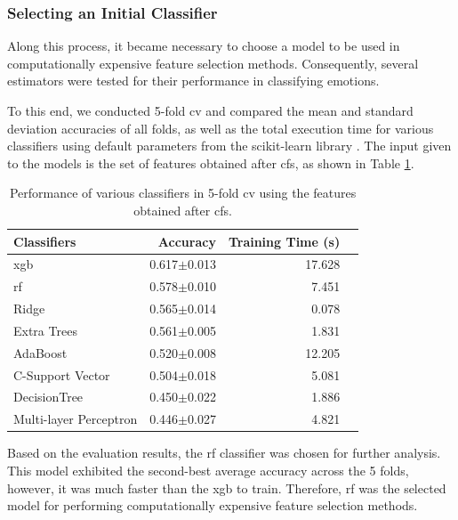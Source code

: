 \subsubsection{Selecting an Initial Classifier}

Along this process, it became necessary to choose a model to be used in computationally expensive feature selection methods. Consequently, several estimators were tested for their performance in classifying emotions.

To this end, we conducted 5-fold \ac{cv} and compared the mean and standard deviation accuracies of all folds, as well as the total execution time for various classifiers using default parameters from the scikit-learn library \cite{pedregosa2011scikit}. The input given to the models is the set of features obtained after \ac{cfs}, as shown in Table \ref{tab:modelsPerformance}.

\begin{table}[H]
	\caption{Performance of various classifiers in 5-fold \ac{cv} using the features obtained after \ac{cfs}.}
	\centering
	\label{tab:modelsPerformance}
	\begin{tabular}{lrrr}
		\toprule
		Classifiers &  Accuracy & Training Time (s) \\
		\midrule
		\ac{xgb}                &        0.617$\pm$0.013  & 17.628 \\
		\ac{rf}                &        0.578$\pm$0.010  &  7.451 \\
		Ridge                  &        0.565$\pm$0.014  &  0.078 \\
		Extra Trees            &        0.561$\pm$0.005  &  1.831  \\
		AdaBoost               &        0.520$\pm$0.008  & 12.205  \\
		C-Support Vector       &        0.504$\pm$0.018  &  5.081 \\
		DecisionTree           &        0.450$\pm$0.022  &  1.886 \\
		Multi-layer Perceptron &        0.446$\pm$0.027  &  4.821 \\
		\bottomrule
	\end{tabular}
\end{table}

Based on the evaluation results, the \ac{rf} classifier was chosen for further analysis. This model exhibited the second-best average accuracy across the 5 folds, however, it was much faster than the \ac{xgb} to train. Therefore, \ac{rf} was the selected model for performing computationally expensive feature selection methods.


